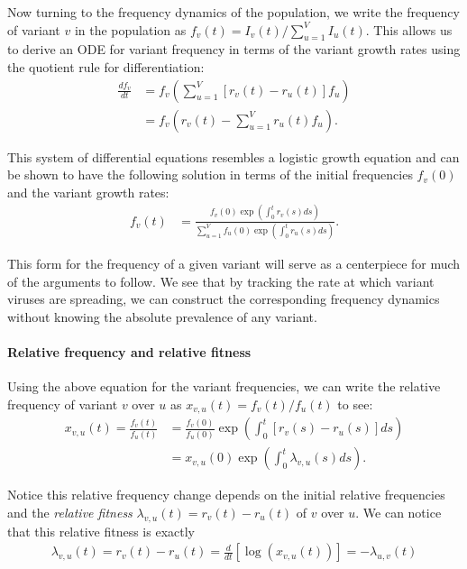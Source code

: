\documentclass[12pt,oneside,letterpaper]{article}
\begin{document}
Now turning to the frequency dynamics of the population, we write the frequency of variant $v$ in the population as  $f_{v}(t) = I_{v}(t) / \sum_{u=1}^{V} I_{u}(t)$.
This allows us to derive an ODE for variant frequency in terms of the variant growth rates using the quotient rule for differentiation:
\begin{align*}
    \frac{d f_{v}}{d t} &= f_{v} \left( \sum_{u=1}^{V} [r_{v}(t) - r_{u}(t)] f_{u} \right)\\
                        &= f_{v} \left( r_{v}(t) - \sum_{u=1}^{V} r_{u}(t) f_{u} \right).
\end{align*}

This system of differential equations resembles a logistic growth equation and can be shown to have the following solution in terms of the initial frequencies $f_{v}(0)$ and the variant growth rates:
\begin{align}
    f_{v}(t) &= \frac{ f_{v}(0) \exp( \int_{0}^{t} r_{v}(s) ds)}{\sum_{u=1}^{V}  f_{u}(0) \exp( \int_{0}^{t} r_{u}(s) ds)}.
\end{align}

This form for the frequency of a given variant will serve as a centerpiece for much of the arguments to follow.
We see that by tracking the rate at which variant viruses are spreading, we can construct the corresponding frequency dynamics without knowing the absolute prevalence of any variant.

\paragraph{Relative frequency and relative fitness}%

Using the above equation for the variant frequencies, we can write the relative frequency of variant $v$ over $u$ as $x_{v,u}(t) = f_{v}(t) / f_{u}(t)$ to see:
\begin{align*}
    x_{v, u}(t) = \frac{f_{v}(t)}{f_{u}(t)} &= \frac{f_{v}(0)}{f_{u}(0)} \exp \left( \int_{0}^{t} [r_{v}(s) - r_{u}(s)] ds \right)\\
                                            &=x_{v,u}(0)\exp \left( \int_{0}^{t} \lambda_{v,u}(s) ds \right).
\end{align*}

Notice this relative frequency change depends on the initial relative frequencies and the \emph{relative fitness} $\lambda_{v,u}(t) = r_{v}(t) - r_{u}(t)$ of $v$ over $u$.
We can notice that this relative fitness is exactly
\begin{align}
\lambda_{v, u}(t) = r_{v}(t) - r_{u}(t) = \frac{d }{d t} \left[\log \left( x_{v,u}(t) \right) \right] = - \lambda_{u,v}(t)
\end{align}
\end{document}
